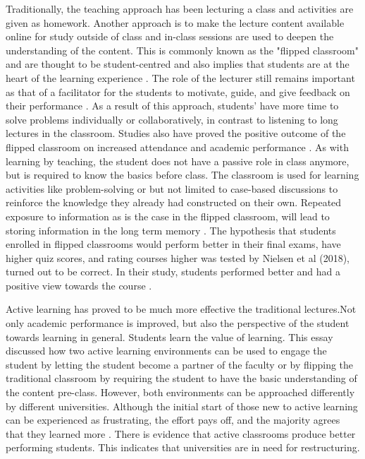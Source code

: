 \documentclass[12pt]{article}
\begin{document}
Traditionally, the teaching approach has been lecturing a class and activities are given as homework. Another approach is to make the lecture content available online for study outside of class and in-class sessions are used to deepen the understanding of the content. This is commonly known as the "flipped classroom" and are thought to be student-centred and also implies that students are at the heart of the learning experience \cite{understanding-flipped-classroom}. The role of the lecturer still remains important as that of a facilitator for the students to motivate, guide, and give feedback on their performance \cite{flip-your-classroom}. As a result of this approach, students' have more time to solve problems individually or collaboratively, in contrast to listening to long lectures in the classroom. Studies also have proved the positive outcome of the flipped classroom on increased attendance and academic performance \cite{the-flipped-classroom}. As with learning by teaching, the student does not have a passive role in class anymore, but is required to know the basics before class. The classroom is used for learning activities like problem-solving or but not limited to case-based discussions to reinforce the knowledge they already had constructed on their own. Repeated exposure to information as is the case in the flipped classroom, will lead to storing information in the long term memory \cite{impact-of-flipped-classroom}. The hypothesis that students enrolled in flipped classrooms would perform better in their final exams, have higher quiz scores, and rating courses higher was tested by Nielsen et al (2018), turned out to be correct. In their study, students performed better and had a positive view towards the course \cite{impact-of-flipped-classroom}.

Active learning has proved to be much more effective the traditional lectures.Not only academic performance is improved, but also the perspective of the student towards learning in general. Students learn the value of learning. This essay discussed how two active learning environments can be used to engage the student by letting the student become a partner of the faculty or by flipping the traditional classroom by requiring the student to have the basic understanding  of the content pre-class. However, both environments can be approached differently by different universities. Although the initial start of those new to active learning can be experienced as frustrating, the effort pays off, and the majority agrees that they learned more \cite{guide-to-teaching-alc}. There is evidence that active classrooms produce better performing students. This indicates that universities are in need for restructuring.

\newpage



\end{document}
